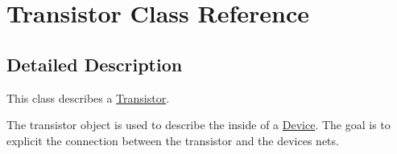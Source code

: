\hypertarget{class_transistor}{}\section{Transistor Class Reference}
\label{class_transistor}


\subsection{Detailed Description}
This class describes a \mbox{\hyperlink{class_transistor}{Transistor}}.

The transistor object is used to describe the inside of a \mbox{\hyperlink{class_device}{Device}}. The goal is to explicit the connection between the transistor and the device\textquotesingle{}s nets. 